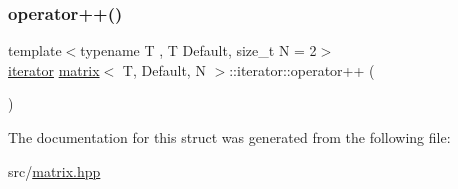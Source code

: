 \subsubsection{\texorpdfstring{operator++()}{operator++()}}
{\footnotesize\ttfamily template$<$typename T , T Default, size\+\_\+t N = 2$>$ \\
\hyperlink{structmatrix_1_1iterator}{iterator} \hyperlink{structmatrix}{matrix}$<$ T, Default, N $>$\+::iterator\+::operator++ (\begin{DoxyParamCaption}{ }\end{DoxyParamCaption})\hspace{0.3cm}{\ttfamily [inline]}}



The documentation for this struct was generated from the following file\+:\begin{DoxyCompactItemize}
\item 
src/\hyperlink{matrix_8hpp}{matrix.\+hpp}\end{DoxyCompactItemize}
